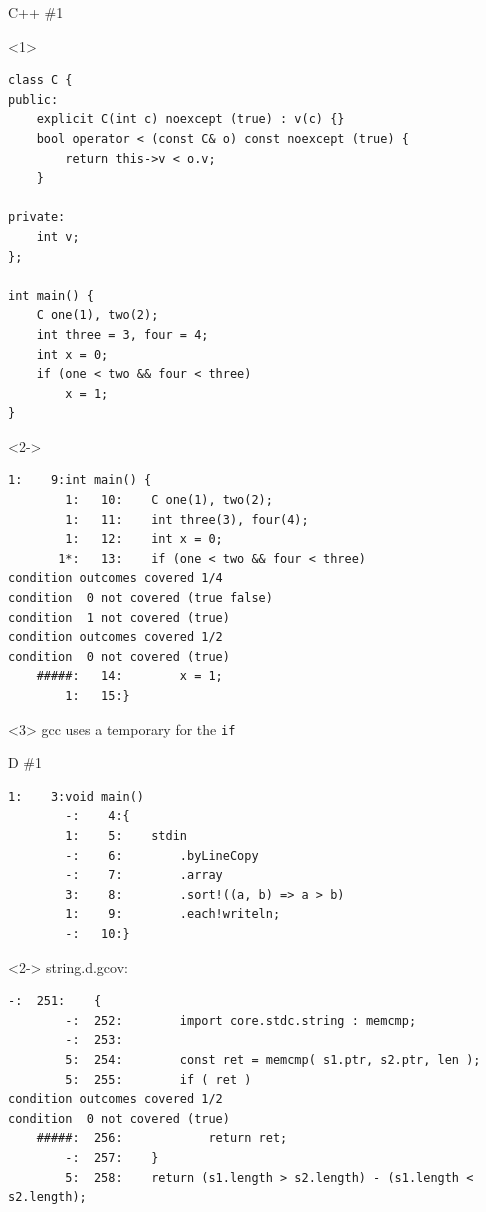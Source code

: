 \documentclass[xcolor = {dvipsnames, table}, aspectratio=169]{beamer}
\begin{document}
\begin{frame}[fragile, t]
    \begin{block}{C++ \#1}
        \begin{onlyenv}<1>
            \begin{lstlisting}[basicstyle = \scriptsize\ttfamily]
class C {
public:
    explicit C(int c) noexcept (true) : v(c) {}
    bool operator < (const C& o) const noexcept (true) {
        return this->v < o.v;
    }

private:
    int v;
};

int main() {
    C one(1), two(2);
    int three = 3, four = 4;
    int x = 0;
    if (one < two && four < three)
        x = 1;
}
            \end{lstlisting}
        \end{onlyenv}
        \begin{onlyenv}<2->
            \begin{lstlisting}[basicstyle = \scriptsize\ttfamily]
        1:    9:int main() {
        1:   10:    C one(1), two(2);
        1:   11:    int three(3), four(4);
        1:   12:    int x = 0;
       1*:   13:    if (one < two && four < three)
condition outcomes covered 1/4
condition  0 not covered (true false)
condition  1 not covered (true)
condition outcomes covered 1/2
condition  0 not covered (true)
    #####:   14:        x = 1;
        1:   15:}
            \end{lstlisting}
        \end{onlyenv}
    \end{block}

    \begin{block}{}<3>
        gcc uses a temporary for the \lstinline{if}
    \end{block}
\end{frame}

\begin{frame}[fragile, t]
    \begin{block}{D \#1}
        \begin{lstlisting}[basicstyle = \scriptsize\ttfamily]
        1:    3:void main()
        -:    4:{
        1:    5:    stdin
        -:    6:        .byLineCopy
        -:    7:        .array
        3:    8:        .sort!((a, b) => a > b)
        1:    9:        .each!writeln;
        -:   10:}
        \end{lstlisting}

        \begin{visibleenv}<2->
            string.d.gcov:
            \begin{lstlisting}[basicstyle = \tiny\ttfamily]
        -:  251:    {
        -:  252:        import core.stdc.string : memcmp;
        -:  253:
        5:  254:        const ret = memcmp( s1.ptr, s2.ptr, len );
        5:  255:        if ( ret )
condition outcomes covered 1/2
condition  0 not covered (true)
    #####:  256:            return ret;
        -:  257:    }
        5:  258:    return (s1.length > s2.length) - (s1.length < s2.length);
            \end{lstlisting}
        \end{visibleenv}
    \end{block}
\end{frame}
\end{document}
